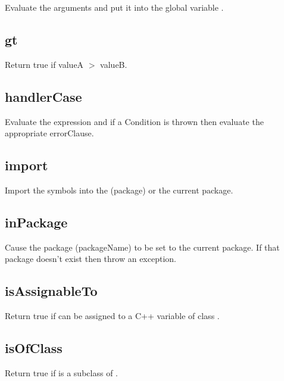 \begin{itemize}
  Evaluate the arguments and put it into the global variable .

\subsection{gt}
  \par

  Return true if valueA $>$ valueB.

\subsection{handlerCase}

  Evaluate the expression and if a Condition is thrown then evaluate the appropriate errorClause.

\subsection{import}

  Import the symbols into the (package) or the current package.

\subsection{inPackage}

  Cause the package (packageName) to be set to the current package.
  If that package doesn't exist then throw an exception.

\subsection{isAssignableTo}

  Return true if  can be assigned to a C++ variable of class .

\subsection{isOfClass}

  Return true if  is a subclass of .


\end{itemize}
